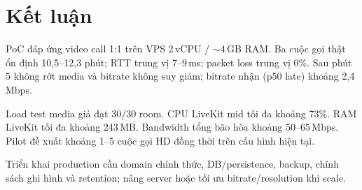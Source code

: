 \section{Kết luận}

PoC đáp ứng video call 1:1 trên VPS 2\,vCPU / $\sim$4\,GB RAM. Ba cuộc gọi thật ổn định
10{,}5--12{,}3 phút; RTT trung vị 7--9\,ms; packet loss trung vị 0\%. Sau phút 5 không rớt
media và bitrate không suy giảm; bitrate nhận (p50 late) khoảng 2{,}4\,Mbps.

Load test media giả đạt 30/30 room. CPU LiveKit mid tối đa khoảng 73\%. RAM LiveKit tối
đa khoảng 243\,MB. Bandwidth tổng bão hòa khoảng 50--65\,Mbps. Pilot đề xuất khoảng
1--5 cuộc gọi HD đồng thời trên cấu hình hiện tại.

Triển khai production cần domain chính thức, DB/persistence, backup, chính sách ghi hình
và retention; nâng server hoặc tối ưu bitrate/resolution khi scale.
